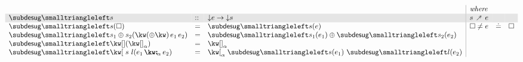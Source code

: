 \begin{figure}[H]
\small
$\begin{array}{lll|llll}
   \arrayrulecolor{lightgray}
   &&&\textit{where}
   \\
   \rowcolor{verylightgray}
   \desugarBwdF{s} &::& \Below{e} \to \Below{s}
   & s \desugarFwd e
   &&
   \\
   \desugarBwdF{s}(\hole)
   &=&
   \desugarBwdF{s}(e)
   &
   \hole \neq e &\eq& \hole
   \\
   \desugarBwdF{\exBinaryApp{s_{1}}{\primOp}{s_{2}}}(\exApp{\exApp{\exOp{\primOp}}{e_{1}}}{e_{2}})
   &=&
   \exBinaryApp{\desugarBwdF{s_1}(e_1)}{\primOp}{\desugarBwdF{s_2}(e_2)}
   \\
   \desugarBwdF{\exNil}(\annNil{\alpha}) &=& \annNil{\alpha}
   \\
   \desugarBwdF{\exList{s}{l}}(\annCons{e_1}{e_2}{\alpha})
   &=&
   \annList{\desugarBwdF{s}(e_1)}{\desugarBwdF{l}(e_2)}{\alpha}
\end{array}$\\[3mm]


\end{figure}
